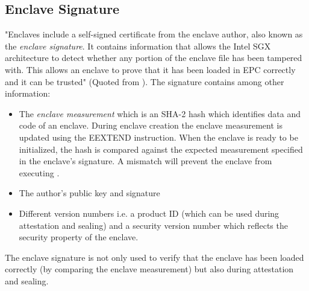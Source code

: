 \subsection{Enclave Signature}
\label{sec:EnclaveSignature}
"Enclaves include a self-signed certificate from the enclave author, also known as the \textit{enclave signature}. It contains information that allows the Intel SGX architecture 
to detect whether any portion of the enclave file has been tampered with. This allows an enclave to prove that it has been loaded in EPC correctly and it can be trusted" (Quoted
from \cite{IntelEnclaveSignature}). The signature contains among other information:
\begin{itemize}
    \item The \textit{enclave measurement} which is an SHA-2 hash \cite{Costan2016IntelSE} which identifies data and code of an enclave. During enclave creation the enclave
          measurement is updated using the EEXTEND instruction. When the enclave is ready to be initialized, the hash is compared against the expected measurement specified
          in the enclave's signature. A mismatch will prevent the enclave from executing \cite{IntelEnclaveSignature}.
    \item The author's public key and signature
    \item Different version numbers i.e. a product ID (which can be used during attestation and sealing) and a security version number which reflects the security property of the
          enclave.
\end{itemize}
The enclave signature is not only used to verify that the enclave has been loaded correctly (by comparing the enclave measurement) but also during attestation and sealing.